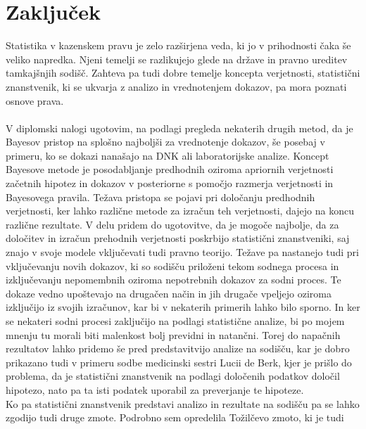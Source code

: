 \documentclass[fin1, tisk]{fmfdelo}
\theoremstyle{definition} %
\theoremstyle{trditev} %
\theoremstyle{izrek}
\begin{document}
\section{Zaključek}
Statistika v kazenskem pravu je zelo razširjena veda, ki jo v prihodnosti čaka še veliko napredka. Njeni temelji se razlikujejo glede na države in pravno ureditev
tamkajšnjih sodišč. Zahteva pa tudi dobre temelje koncepta verjetnosti, statistični znanstvenik, ki se ukvarja z analizo in vrednotenjem dokazov, pa mora poznati
osnove prava.\\\\
V diplomski nalogi ugotovim, na podlagi pregleda nekaterih drugih metod, da je Bayesov pristop na splošno najboljši za vrednotenje dokazov, še posebaj v primeru,
ko se dokazi nanašajo na DNK ali laboratorijske analize. Koncept Bayesove metode je posodabljanje predhodnih oziroma apriornih verjetnosti začetnih hipotez in dokazov v
posteriorne s pomočjo razmerja  verjetnosti in Bayesovega pravila. Težava pristopa se pojavi pri določanju predhodnih verjetnosti, ker lahko različne metode za izračun
teh verjetnosti, dajejo na koncu različne rezultate. V delu pridem do ugotovitve, da je mogoče najbolje, da za določitev in izračun prehodnih verjetnosti poskrbijo
statistični znanstveniki, saj znajo v svoje modele vključevati tudi pravno teorijo. Težave pa nastanejo tudi pri vključevanju novih dokazov, ki so sodišču priloženi
tekom sodnega procesa in izključevanju nepomembnih oziroma nepotrebnih dokazov za sodni proces. Te dokaze vedno upoštevajo na drugačen način in jih drugače
vpeljejo oziroma izključijo iz svojih izračunov, kar bi v nekaterih primerih lahko bilo sporno. In ker se nekateri sodni procesi zaključijo na podlagi statistične
analize, bi po mojem mnenju tu morali biti malenkost bolj previdni in natančni. Torej do napačnih rezultatov lahko pridemo še pred predstavitvijo analize na sodišču, kar
je dobro prikazano tudi v primeru sodbe medicinski sestri Lucii de Berk, kjer je prišlo do problema, da je statistični znanstvenik na podlagi določenih podatkov
določil hipotezo, nato pa ta isti podatek uporabil za preverjanje te hipoteze. \\
Ko pa statistični znanstvenik predstavi analizo in rezultate na sodišču pa se lahko zgodijo tudi druge zmote. Podrobno sem opredelila Tožilčevo zmoto, ki je tudi
\end{document}
